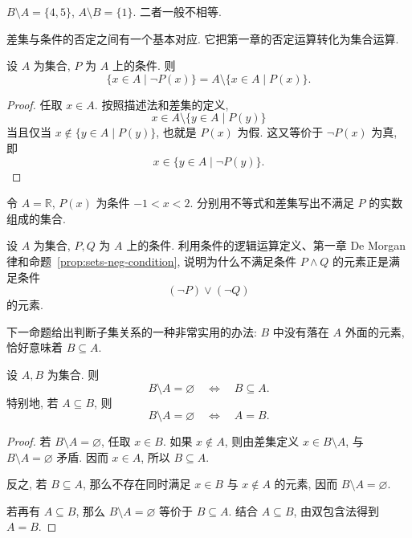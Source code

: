 \documentclass[usesamecnt, thmcnt=section, lang=cn, newtx, 10pt, scheme=chinese]{elegantbook}
\begin{document}
\begin{solution}
$B\setminus A=\{4,5\}$, $A\setminus B=\{1\}$. 二者一般不相等.
\end{solution}

差集与条件的否定之间有一个基本对应. 它把第一章的否定运算转化为集合运算.

\begin{proposition}\label{prop:sets-neg-condition}
设 $A$ 为集合, $P $ 为 $A$ 上的条件. 则
\begin{equation}\label{eq:sets-neg-condition}
 \{x\in A\mid \neg P(x)\}
 =A\setminus\{x\in A\mid P(x)\}.
\end{equation}
\end{proposition}

\begin{proof}
任取 $x\in A$. 按照描述法和差集的定义,
\[
 x\in A\setminus\{y\in A\mid P(y)\}
\]
当且仅当 $x\notin\{y\in A\mid P(y)\}$, 也就是 $P(x)$ 为假. 这又等价于 $\neg P(x)$ 为真, 即
\[
 x\in\{y\in A\mid\neg P(y)\}.
\]
\end{proof}

\begin{exercise}\label{ex:sets-neg-condition-01}
令 $A=\mathbb R$, $P(x)$ 为条件 $-1<x<2$. 分别用不等式和差集写出不满足 $P $ 的实数组成的集合.
\end{exercise}

\begin{exercise}\label{ex:sets-neg-condition-02}
设 $A$ 为集合, $P,Q$ 为 $A$ 上的条件. 利用条件的逻辑运算定义、第一章 De Morgan 律和命题~\ref{prop:sets-neg-condition}, 说明为什么不满足条件 $P\wedge Q$ 的元素正是满足条件
\[
 (\neg P)\vee(\neg Q)
\]
的元素.
\end{exercise}

下一命题给出判断子集关系的一种非常实用的办法: $B$ 中没有落在 $A$ 外面的元素, 恰好意味着 $B\subseteq A$.

\begin{proposition}\label{prop:sets-difference-empty}
设 $A,B$ 为集合. 则
\[
 B\setminus A=\varnothing
 \quad\Leftrightarrow\quad
 B\subseteq A.
\]
特别地, 若 $A\subseteq B$, 则
\[
 B\setminus A=\varnothing
 \quad\Leftrightarrow\quad
 A=B.
\]
\end{proposition}

\begin{proof}
若 $B\setminus A=\varnothing$, 任取 $x\in B$. 如果 $x\notin A$, 则由差集定义 $x\in B\setminus A$, 与 $B\setminus A=\varnothing$ 矛盾. 因而 $x\in A$, 所以 $B\subseteq A$.

反之, 若 $B\subseteq A$, 那么不存在同时满足 $x\in B$ 与 $x\notin A$ 的元素, 因而 $B\setminus A=\varnothing$.

若再有 $A\subseteq B$, 那么 $B\setminus A=\varnothing$ 等价于 $B\subseteq A$. 结合 $A\subseteq B$, 由双包含法得到 $A=B$.
\end{proof}
\end{document}
